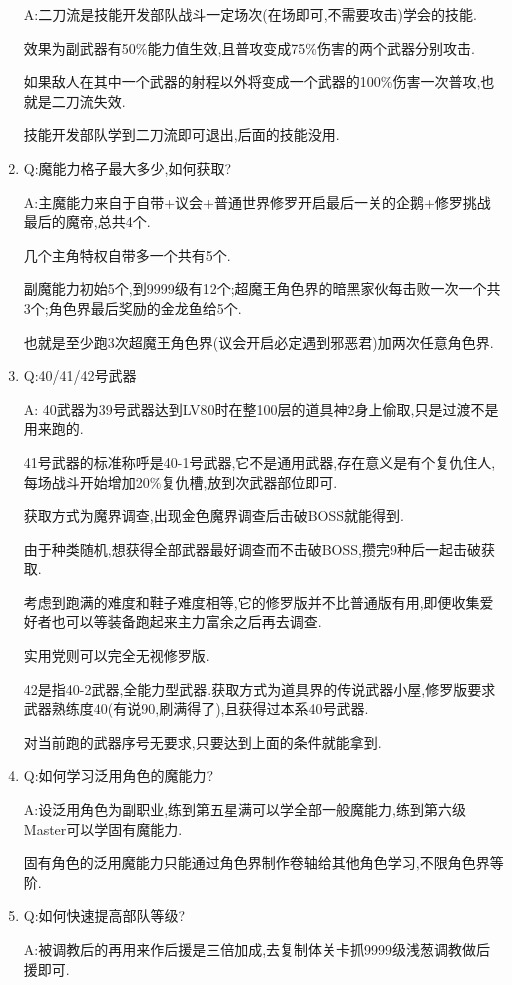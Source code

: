 \begin{enumerate}
	A:二刀流是技能开发部队战斗一定场次(在场即可,不需要攻击)学会的技能.

	效果为副武器有50\%能力值生效,且普攻变成75\%伤害的两个武器分别攻击.

	如果敌人在其中一个武器的射程以外将变成一个武器的100\%伤害一次普攻,也就是二刀流失效.

	技能开发部队学到二刀流即可退出,后面的技能没用.

	\item
	Q:魔能力格子最大多少,如何获取?

	A:主魔能力来自于自带+议会+普通世界修罗开启最后一关的企鹅+修罗挑战最后的魔帝,总共4个.

	几个主角特权自带多一个共有5个.
	
	副魔能力初始5个,到9999级有12个;超魔王角色界的暗黑家伙每击败一次一个共3个;角色界最后奖励的金龙鱼给5个.

	也就是至少跑3次超魔王角色界(议会开启必定遇到邪恶君)加两次任意角色界.

	\item
	Q:40/41/42号武器

	A:
	40武器为39号武器达到LV80时在整100层的道具神2身上偷取,只是过渡不是用来跑的.

	41号武器的标准称呼是40-1号武器,它不是通用武器,存在意义是有个复仇住人,每场战斗开始增加20\%复仇槽,放到次武器部位即可.

	获取方式为魔界调查,出现金色魔界调查后击破BOSS就能得到.

	由于种类随机,想获得全部武器最好调查而不击破BOSS,攒完9种后一起击破获取.

	考虑到跑满的难度和鞋子难度相等,它的修罗版并不比普通版有用,即便收集爱好者也可以等装备跑起来主力富余之后再去调查.

	实用党则可以完全无视修罗版.

	42是指40-2武器,全能力型武器.获取方式为道具界的传说武器小屋,修罗版要求武器熟练度40(有说90,刷满得了),且获得过本系40号武器.

	对当前跑的武器序号无要求,只要达到上面的条件就能拿到.

	\item
	Q:如何学习泛用角色的魔能力?

	A:设泛用角色为副职业,练到第五星满可以学全部一般魔能力,练到第六级Master可以学固有魔能力.

	固有角色的泛用魔能力只能通过角色界制作卷轴给其他角色学习,不限角色界等阶.

	\item
	Q:如何快速提高部队等级?

	A:被调教后的再用来作后援是三倍加成,去复制体关卡抓9999级浅葱调教做后援即可.


\end{enumerate}
